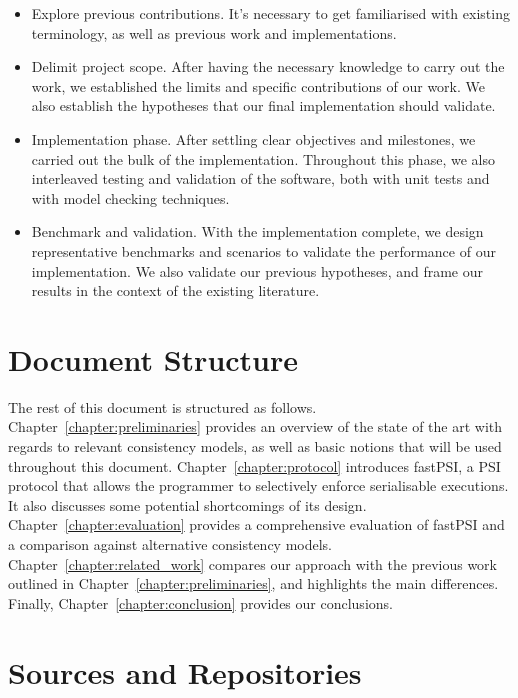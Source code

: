 \begin{itemize}
    \item Explore previous contributions. It's necessary to get familiarised with existing terminology, as well as previous work and implementations.

    \item Delimit project scope. After having the necessary knowledge to carry out the work, we established the limits and specific contributions of our work. We also establish the hypotheses that our final implementation should validate.

    \item Implementation phase. After settling clear objectives and milestones, we carried out the bulk of the implementation. Throughout this phase, we also interleaved testing and validation of the software, both with unit tests and with model checking techniques.

    \item Benchmark and validation. With the implementation complete, we design representative benchmarks and scenarios to validate the performance of our implementation. We also validate our previous hypotheses, and frame our results in the context of the existing literature.
\end{itemize}

\section{Document Structure}

The rest of this document is structured as follows. Chapter~\ref{chapter:preliminaries} provides an overview of the state of the art with regards to relevant consistency models, as well as basic notions that will be used throughout this document. Chapter~\ref{chapter:protocol} introduces fastPSI, a PSI protocol that allows the programmer to selectively enforce serialisable executions. It also discusses some potential shortcomings of its design. Chapter~\ref{chapter:evaluation} provides a comprehensive evaluation of fastPSI and a comparison against alternative consistency models. Chapter~\ref{chapter:related_work} compares our approach with the previous work outlined in Chapter~\ref{chapter:preliminaries}, and highlights the main differences. Finally, Chapter~\ref{chapter:conclusion} provides our conclusions.

\section{Sources and Repositories}


